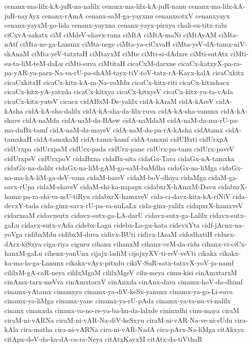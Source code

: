 {cenanx-ma-lilx-kA-juR-na-nalilx
cenanx-ma-lilx-kA-juR-nanu
cenanx-ma-lilx-kA-juR-nayAyx
cenanx-rAmA
cenanx-saM-ga-yayxnu
cenanxsotxV
cenanxyayx
cenanx-yayxM-go-lida
cenanx-yayxna
cenanx-yayx-pirxya
chali-su-titx-ralu
ciCxvA-sakatx
ciM
ciMdeV-shavx-rana
ciMtA
ciMtA-maNi
ciMtAyAM
ciMta-nAtf
ciMta-ne-ga-Lanunx
ciMta-nege
ciMta-ya-ciCxvaH
ciMta-yeV-dA-tamx-niV-shAnaM
ciMta-yeV-tatxtaH
ciMtayxM
ciMte
ciMti-si-dAdxre
ciMti-sutAtx
ciMti-su-ta-liM-teM-daLu
ciMti-suva
ciMtitaH
cicaCxM-darxne
cicaCx-katxyX-pa-ra-pa-yAR-ya-parx-Na-va-rU-pa-shAM-tayx-tiV-toV-tatx-rA-Kayx-kalA
cicaCxkitx
cicaCxkitxH
cicaCx-kitx-kA-ra-Na-voMdu
cicaCx-kitx-riti
cicaCx-kitxshacx
cicaCx-kitx-yA-yatxda
cicaCx-kitxya
cicaCx-kitxyeV
cicaCx-kitx-yu-ta-vAda
cicaCx-kitx-yuteV
cicacx
cidABxM-De-yalilx
cidA-kAraM
cidA-kAreV
cidA-kAsha
cidA-kA-sha-dalilx
cidA-kA-sha-da-lilx-ruva
cidA-kA-sha-vanunx
cidA-kA-shave
cidA-naMda
cidA-naM-da-BAsw
cidA-naMdaM
cidA-naM-da-ma-rU-pa-ma-duBx-tamf
cidA-naM-da-mayeV
cidA-naM-da-pa-rA-kAsha
cidAtamx
cidA-tamxkaH
cidA-tamxkaM
cidA-tamx-kamf
cidA-tamxni
cidUBxti
cidUrxpA
cidUrxpa
cidUrxpaM
cidUrx-pada
cidUrx-pane
cidUrx-pa-tanu
cidUrx-paveV
cidUrxpeV
cidUrxpoV
cidaBxna
cidaBx-sita
cidaGx-Tava
cidaGx-nA-tamxka
cidaGx-na-dalilx
cidaGx-na-liM-gAM-ga-saM-baMdha
cidaGx-na-liMga
cidaGx-na-ma-hA-liM-ga-deV-vana
cidaM-bareV
cidaM-boV-dhiya
cidaMga
cidaM-ga-savx-rUpa
cidaM-shaveV
cidaM-shi-ka-napapx
cidabxrX-hAmxM-Davu
cidabxrX-hamx-pa-ra-shi-va-mU-tiRyu
cidabxrX-hamxveV
cida-ci-davx-kitx-kA-riNiV
cida-devxY-tada
cida-ginx-savx-rU-pa-va-nuLaLx
cida-ginx-yalilx
cidapxrX-hamxveV
cidarxsaM
cidavxsutx
cidavx-sutx-ga-LA-darU
cidavx-sutx-ga-Lalilx
cidavx-sutx-gaLu
cidavx-sutx-vAda
cidebx-Lagu
cidebx-La-gu-hata
cidevxYta
cidf-jAcnx-na-yoVga
cidibxMdu
cidibxM-duva
cidivx-BUti
cidivx-lAsaM
cidodhxtiH
cidurx-dArx-kiSxya
ciga-riya
ciguru
cihanx
cihanxM
cihanx-veM-da-ridu
cihanx-vi-ciCx-hanxM-gaLu
cihenx-yanUnx
cijajx-ladiM
cijojxyXV-ti-reV-veVti
cikakx
cikakx-ka-ma-la-ga-Lanunx
cikakx-vAyx-pitxdu
cikiV-SuR-satx-tatxvX-yoV-ja-namf
cililxM-gA-caR-neya
cililxMgaM
cililxMgeV
cilu-meya
cimu-kisi
cinAmxtarxM
cinAmx-tarx-meVva
cinAmxtorxV
cinAnxda
cinAnx-dava
cinamx-hoV-da-dhimf
cinamx-yAtamx
cinamxya
cinamx-ya-diV-keSx-yanunx
cinamx-ya-go-Li-suva
cinamx-ya-liMga
cinamx-yane
cinamx-ya-rU-pAda
cinamx-ya-ta-nu-vi-nalilx
cinanx
cinanxda
cinanx-va-no-re-ya-ba-hu-da-lalxde
cininxdhi
cinu-maya
ciraM
ciraM-ni-vARNa
ciraM-ni-vAR-Na-diV-keSxyu
ciraM-ni-vAR-Na-ve-ni-sUdu
cira-kAla
cira-matha
cira-ni-vARNa
cira-ni-vAR-NadA
cira-pArx-Na-liMga
citAkxya
citApx-doV-da-ka-dA-ca-ra-Neya
citAtxKayxM
citAtx-da-tiVthaR
}
